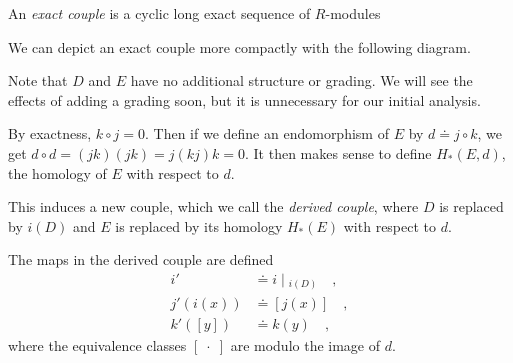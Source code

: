 \documentclass[twoside,10pt]{article}
\begin{document}
\begin{defn}[]
	An \textit{exact couple} is a cyclic long exact sequence of $R$-modules
	\begin{center}
	\end{center}
\end{defn}
We can depict an exact couple more compactly with the following diagram.
\begin{center}
\end{center}
Note that $D$ and $E$ have no additional structure or grading. We will see the effects of adding a grading soon, but it is unnecessary for our initial analysis.

By exactness, $k \circ j = 0$. Then if we define an endomorphism of $E$ by $d \doteq j\circ k$, we get $d \circ d = (jk)(jk) = j(kj)k = 0$. It then makes sense to define $H_*(E,d)$, the homology of $E$ with respect to $d$.

This induces a new couple, which we call the \textit{derived couple}, where $D$ is replaced by $i(D)$ and $E$ is replaced by its homology $H_*(E)$ with respect to $d$.
\begin{center}
\end{center}
The maps in the derived couple are defined
\begin{align*}
	i' &\doteq i \;|\;_{i(D)}\quad, \\
	j'(i(x)) &\doteq [j(x)]\quad, \\
	k'([y]) &\doteq k(y)\quad,
\end{align*}
where the equivalence classes $[\;\cdot\;]$ are modulo the image of $d$.
\end{document}
